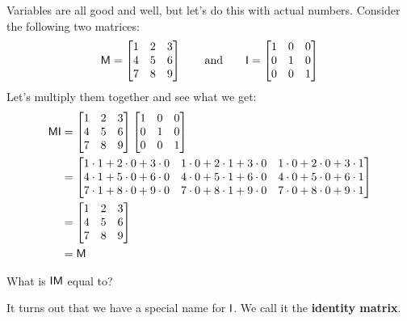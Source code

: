 Variables are all good and well, but let's do this with actual
numbers. Consider the following two matrices:
\[
\mathsf{M} =
\begin{bmatrix}
1 & 2 & 3\\
4 & 5 & 6\\
7 & 8 & 9
\end{bmatrix}
\qquad\text{and}\qquad
\mathsf{I} = 
\begin{bmatrix}
1 & 0 & 0\\
0 & 1 & 0\\
0 & 0 & 1
\end{bmatrix}
\]
Let's multiply them together and see what we get:
\begin{align*}
\mathsf{M}\mathsf{I} &= \begin{bmatrix}
1 & 2 & 3\\
4 & 5 & 6\\
7 & 8 & 9
\end{bmatrix}
\begin{bmatrix}
1 & 0 & 0\\
0 & 1 & 0\\
0 & 0 & 1
\end{bmatrix} \\
&=
\begin{bmatrix}
1\cdot 1 + 2\cdot 0 + 3\cdot 0 & 1\cdot 0 + 2\cdot 1 + 3\cdot 0 & 1\cdot 0 + 2\cdot 0 + 3\cdot 1\\
4\cdot 1 + 5\cdot 0 + 6\cdot 0 & 4\cdot 0 + 5\cdot 1 + 6\cdot 0 & 4\cdot 0 + 5\cdot 0 + 6\cdot 1\\
7\cdot 1 + 8\cdot 0 + 9\cdot 0 & 7\cdot 0 + 8\cdot 1 + 9\cdot 0 & 7\cdot 0 + 8\cdot 0 + 9\cdot 1 
\end{bmatrix} \\
&=
\begin{bmatrix}
1 & 2 & 3\\
4 & 5 & 6\\
7 & 8 & 9
\end{bmatrix} \\
&= \mathsf{M}
\end{align*}

\begin{ques}
What is $\mathsf{I}\mathsf{M}$ equal to?
\end{ques}
\QM 

It turns out that we have a special name for $\mathsf{I}$.  We call it the \textbf{identity matrix}.

